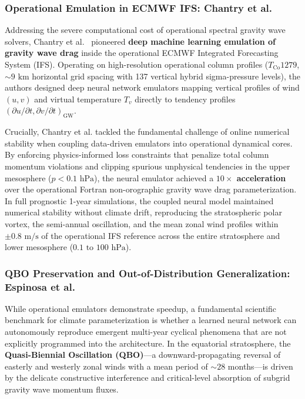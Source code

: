\subsubsection{Operational Emulation in ECMWF IFS: Chantry et al.}
Addressing the severe computational cost of operational spectral gravity wave solvers, Chantry et al.~\cite{chantry2021gravity} pioneered \textbf{deep machine learning emulation of gravity wave drag} inside the operational ECMWF Integrated Forecasting System (IFS). Operating on high-resolution operational column profiles ($T_{\text{Co}}1279$, $\sim 9\text{ km}$ horizontal grid spacing with 137 vertical hybrid sigma-pressure levels), the authors designed deep neural network emulators mapping vertical profiles of wind $(u, v)$ and virtual temperature $T_v$ directly to tendency profiles $(\partial u / \partial t, \partial v / \partial t)_{\text{GW}}$.

Crucially, Chantry et al. tackled the fundamental challenge of online numerical stability when coupling data-driven emulators into operational dynamical cores. By enforcing physics-informed loss constraints that penalize total column momentum violations and clipping spurious unphysical tendencies in the upper mesosphere ($p < 0.1\text{ hPa}$), the neural emulator achieved a \textbf{$10\times$ acceleration} over the operational Fortran non-orographic gravity wave drag parameterization. In full prognostic 1-year simulations, the coupled neural model maintained numerical stability without climate drift, reproducing the stratospheric polar vortex, the semi-annual oscillation, and the mean zonal wind profiles within $\pm 0.8\text{ m/s}$ of the operational IFS reference across the entire stratosphere and lower mesosphere ($0.1\text{ to } 100\text{ hPa}$).

\subsubsection{QBO Preservation and Out-of-Distribution Generalization: Espinosa et al.}
While operational emulators demonstrate speedup, a fundamental scientific benchmark for climate parameterization is whether a learned neural network can autonomously reproduce emergent multi-year cyclical phenomena that are not explicitly programmed into the architecture. In the equatorial stratosphere, the \textbf{Quasi-Biennial Oscillation (QBO)}---a downward-propagating reversal of easterly and westerly zonal winds with a mean period of $\sim 28$ months---is driven by the delicate constructive interference and critical-level absorption of subgrid gravity wave momentum fluxes.

